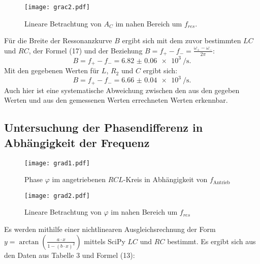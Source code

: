 \begin{figure}[H]
	\centering
	\caption{Lineare Betrachtung von $A_C$ im nahen Bereich um $f_{res}$.}
	\texttt{[image: grac2.pdf]}
	\label{fig:grac2}
\end{figure}

Für die Breite der Ressonanzkurve $B$ ergibt sich mit dem zuvor bestimmten $LC$ und $RC$, der Formel (17) und der Beziehung $B = f_+ - f_- = \frac{\omega_+ - \omega_-}{2\pi}$:
\begin{displaymath}
B = f_+ - f_- = \SI{6.82(6)e3}{\per\second}\text{.}
\end{displaymath}
Mit den gegebenen Werten für $L$, $R_2$ und $C$ ergibt sich:
\begin{displaymath}
B = f_+ - f_- = \SI{6.66(4)e3}{\per\second}\text{.}
\end{displaymath}
Auch hier ist eine systematische Abweichung zwischen den aus den gegeben Werten und aus den gemessenen Werten errechneten Werten erkennbar.



\subsection{Untersuchung der Phasendifferenz in Abhängigkeit der Frequenz}
\begin{figure}[H]
	\centering
	\caption{Phase $\varphi$ im angetriebenen $RCL$-Kreis in Abhängigkeit von $f_{\text{Antrieb}}$ }
	\texttt{[image: grad1.pdf]}
	\label{fig:grad1}
\end{figure}
\begin{figure}[H]
	\centering
	\caption{Lineare Betrachtung von $\varphi$ im nahen Bereich um $f_{res}$}
	\texttt{[image: grad2.pdf]}
	\label{fig:grad2}
\end{figure}

\newpage
Es werden mithilfe einer nichtlinearen Ausgleichsrechnung der Form
$y=\arctan \left(\frac{a\cdot x}{1-(b\cdot x)^2}\right)$ mittels SciPy
 \cite{scipy} $LC$ und $RC$ bestimmt.
  Es ergibt sich aus den
  Daten aus Tabelle 3 und Formel (13):

